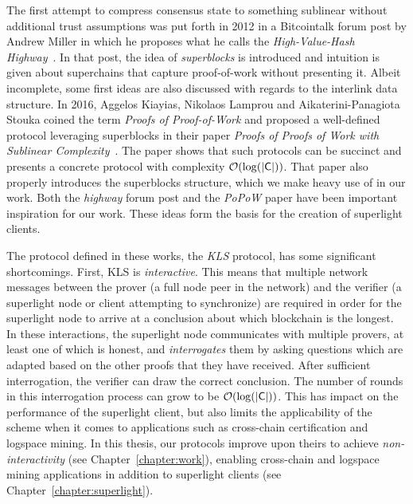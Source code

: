 The first attempt to compress consensus state to something sublinear without
additional trust assumptions was put
forth in 2012 in a Bitcointalk forum post by Andrew Miller in which he proposes what he
calls the \emph{High-Value-Hash Highway}~\cite{highway}. In that post,
the idea of \emph{superblocks} is introduced and intuition is given about
superchains that capture proof-of-work without presenting it.  Albeit incomplete, some
first ideas are also discussed with regards to the interlink data structure.
In 2016,
Aggelos Kiayias, Nikolaos Lamprou and Aikaterini-Panagiota Stouka coined the
term \emph{Proofs of Proof-of-Work} and proposed a
well-defined protocol leveraging superblocks in their paper
\emph{Proofs of Proofs of Work with Sublinear Complexity}~\cite{popow}. The
paper shows that such protocols can be succinct and presents a concrete protocol
with complexity $\mathcal{O}(\log(|\mathsf{C}|))$. That paper also properly introduces the
superblocks structure, which we make heavy use of in our work. Both the
\emph{highway} forum post and the \emph{PoPoW} paper have been important
inspiration for our work. These ideas form the basis for the creation of
superlight clients.

The protocol defined in these works, the \emph{KLS} protocol, has some
significant shortcomings. First, KLS is \emph{interactive}. This
means that multiple network messages between the prover (a full node peer in the
network) and the verifier (a superlight node or client attempting to
synchronize) are required in order for the superlight node to arrive at a
conclusion about which blockchain is the longest. In these interactions, the
superlight node communicates with multiple provers, at least one of which is
honest, and \emph{interrogates} them by asking questions which are adapted based
on the other proofs that they have received. After sufficient interrogation, the
verifier can draw the correct conclusion. The number of rounds in this
interrogation process can grow to be $\mathcal{O}(\log(|\mathsf{C}|))$. This has impact on
the performance of the superlight client, but also limits the applicability of
the scheme when it comes to applications such as cross-chain certification and
logspace mining. In this thesis, our protocols improve upon theirs to achieve
\emph{non-interactivity} (see Chapter~\ref{chapter:work}), enabling cross-chain
and logspace mining applications in addition to superlight clients (see
Chapter~\ref{chapter:superlight}).

